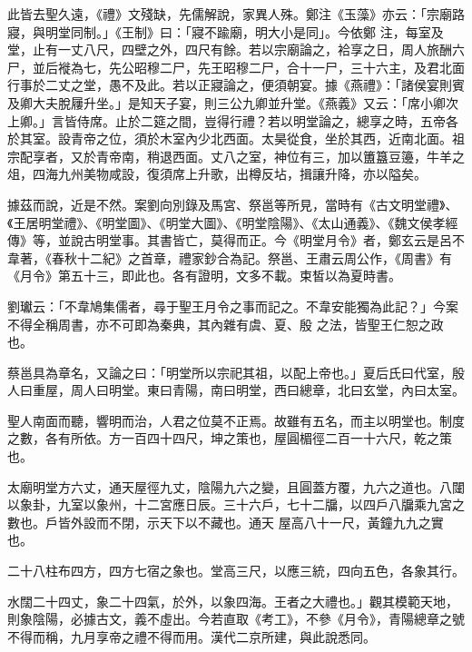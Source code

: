 \begin{pinyinscope}
 此皆去聖久遠，《禮》文殘缺，先儒解說，家異人殊。鄭注《玉藻》亦云：「宗廟路寢，與明堂同制。」《王制》曰：「寢不踰廟，明大小是同」。今依鄭
 注，每室及堂，止有一丈八尺，四壁之外，四尺有餘。若以宗廟論之，袷享之日，周人旅酬六尸，並后褷為七，先公昭穆二尸，先王昭穆二尸，合十一尸，三十六主，及君北面行事於二丈之堂，愚不及此。若以正寢論之，便須朝宴。據《燕禮》：「諸侯宴則賓及卿大夫脫屨升坐。」是知天子宴，則三公九卿並升堂。《燕義》又云：「席小卿次上卿。」言皆侍席。止於二筵之間，豈得行禮？若以明堂論之，總享之時，五帝各於其室。設青帝之位，須於木室內少北西面。太昊從食，坐於其西，近南北面。祖宗配享者，又於青帝南，稍退西面。丈八之室，神位有三，加以簠簋豆籩，牛羊之
 俎，四海九州美物咸設，復須席上升歌，出樽反坫，揖讓升降，亦以隘矣。



 據茲而說，近是不然。案劉向別錄及馬宮、祭邕等所見，當時有《古文明堂禮》、《王居明堂禮》、《明堂圖》、《明堂大圖》、《明堂陰陽》、《太山通義》、《魏文侯孝經傳》等，並說古明堂事。其書皆亡，莫得而正。今《明堂月令》者，鄭玄云是呂不韋著，《春秋十二紀》之首章，禮家鈔合為記。祭邕、王肅云周公作，《周書》有《月令》第五十三，即此也。各有證明，文多不載。束皙以為夏時書。



 劉瓛云：「不韋鳩集儒者，尋于聖王月令之事而記之。不韋安能獨為此記？」今案不得全稱周書，亦不可即為秦典，其內雜有虞、夏、殷
 之法，皆聖王仁恕之政也。



 蔡邕具為章名，又論之曰：「明堂所以宗祀其祖，以配上帝也。」夏后氏曰代室，殷人曰重屋，周人曰明堂。東曰青陽，南曰明堂，西曰總章，北曰玄堂，內曰太室。



 聖人南面而聽，響明而治，人君之位莫不正焉。故雖有五名，而主以明堂也。制度之數，各有所依。方一百四十四尺，坤之策也，屋圓楣徑二百一十六尺，乾之策也。



 太廟明堂方六丈，通天屋徑九丈，陰陽九六之變，且圓蓋方覆，九六之道也。八闥以象卦，九室以象州，十二宮應日辰。三十六戶，七十二牖，以四戶八牖乘九宮之數也。戶皆外設而不閉，示天下以不藏也。通天
 屋高八十一尺，黃鐘九九之實也。



 二十八柱布四方，四方七宿之象也。堂高三尺，以應三統，四向五色，各象其行。



 水闊二十四丈，象二十四氣，於外，以象四海。王者之大禮也。」觀其模範天地，則象陰陽，必據古文，義不虛出。今若直取《考工》，不參《月令》，青陽總章之號不得而稱，九月享帝之禮不得而用。漢代二京所建，與此說悉同。




\end{pinyinscope}
